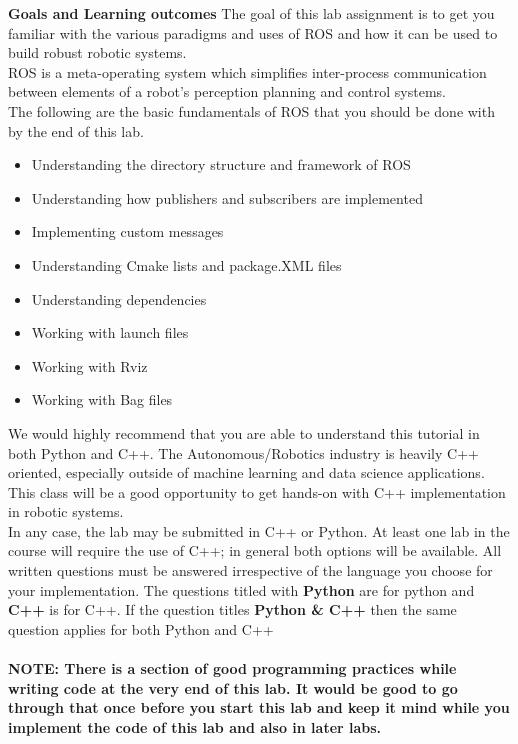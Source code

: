 \documentclass[letta4 paper]{article}
\begin{document}

\textbf{Goals and Learning outcomes}
The goal of this lab assignment is to get you familiar with the various paradigms and uses of ROS and how it can be used to build robust robotic systems.\\
ROS is a meta-operating system which simplifies inter-process communication between elements of a robot's perception planning and control systems.\\ 
The following are the basic fundamentals of ROS that you should be done with by the end of this lab.\\
\begin{itemize}
    \item Understanding the directory structure and framework of ROS
    \item Understanding how publishers and subscribers are implemented
    \item Implementing custom messages
    \item Understanding Cmake lists and package.XML files
    \item Understanding dependencies
    \item Working with launch files
    \item Working with Rviz
    \item Working with Bag files
\end{itemize}{}

We would highly recommend that you are able to understand this tutorial in both Python and C++. The Autonomous/Robotics industry is heavily C++ oriented, especially outside of machine learning and data science applications. This class will be a good opportunity to get hands-on with C++ implementation in robotic systems.\\
In any case, the lab may be submitted in C++ or Python. At least one lab in the course will require the use of C++; in general both options will be available.
All written questions must be answered irrespective of the language you choose for your implementation. 
The questions titled with \textbf{Python} are for python and \textbf{C++} is for C++.
If the question titles \textbf{Python \& C++} then the same question applies for both Python and C++\\
\\
\textbf{NOTE: There is a section of good programming practices while writing code at the very end of this lab. It would be good to go through that once before you start this lab and keep it mind while you implement the code of this lab and also in later labs.}
\newpage
{}
\end{document}
